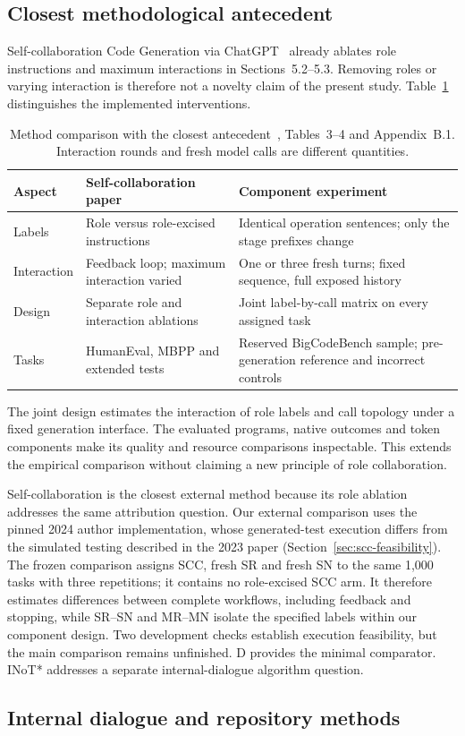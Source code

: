 \subsection{Closest methodological antecedent}
Self-collaboration Code Generation via ChatGPT~\cite{dong2023selfcollaboration} already ablates role instructions and maximum interactions in Sections~5.2--5.3. Removing roles or varying interaction is therefore not a novelty claim of the present study. Table~\ref{tab:closest-method} distinguishes the implemented interventions.

\begin{table}[htbp]\centering\small
\caption{Method comparison with the closest antecedent~\cite{dong2023selfcollaboration}, Tables~3--4 and Appendix~B.1. Interaction rounds and fresh model calls are different quantities.}\label{tab:closest-method}
\begin{tabular}{p{}p{}p{}}\toprule
Aspect & Self-collaboration paper & Component experiment\\\midrule
Labels & Role versus role-excised instructions & Identical operation sentences; only the stage prefixes change\\
Interaction & Feedback loop; maximum interaction varied & One or three fresh turns; fixed sequence, full exposed history\\
Design & Separate role and interaction ablations & Joint label-by-call matrix on every assigned task\\
Tasks & HumanEval, MBPP and extended tests & Reserved BigCodeBench sample; pre-generation reference and incorrect controls\\\bottomrule
\end{tabular}\end{table}

The joint design estimates the interaction of role labels and call topology under a fixed generation interface. The evaluated programs, native outcomes and token components make its quality and resource comparisons inspectable. This extends the empirical comparison without claiming a new principle of role collaboration.

Self-collaboration is the closest external method because its role ablation addresses the same attribution question. Our external comparison uses the pinned 2024 author implementation, whose generated-test execution differs from the simulated testing described in the 2023 paper (Section~\ref{sec:scc-feasibility}). The frozen comparison assigns SCC, fresh SR and fresh SN to the same 1,000 tasks with three repetitions; it contains no role-excised SCC arm. It therefore estimates differences between complete workflows, including feedback and stopping, while SR--SN and MR--MN isolate the specified labels within our component design. Two development checks establish execution feasibility, but the main comparison remains unfinished. D provides the minimal comparator. INoT* addresses a separate internal-dialogue algorithm question.

\subsection{Internal dialogue and repository methods}
